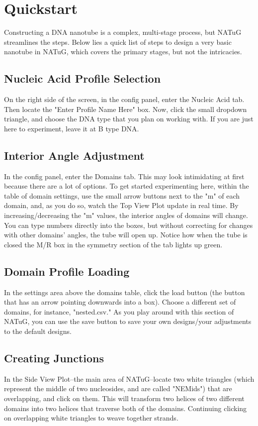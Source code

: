 \documentclass[titlepage]{article}
\begin{document}
	\section{Quickstart}
	
	Constructing a DNA nanotube is a complex, multi-stage process, but NATuG streamlines the steps. Below lies a quick list of steps to design a very basic nanotube in NATuG, which covers the primary stages, but not the intricacies.
	
	\subsection{Nucleic Acid Profile Selection}
	On the right side of the screen, in the config panel, enter the Nucleic Acid tab. Then locate the "Enter Profile Name Here" box. Now, click the small dropdown triangle, and choose the DNA type that you plan on working with. If you are just here to experiment, leave it at B type DNA.
		
	\subsection{Interior Angle Adjustment}
	In the config panel, enter the Domains tab. This may look intimidating at first because there are a lot of  options. To get started experimenting here, within the table of domain settings, use the small arrow buttons next to the "m" of each domain, and, as you do so, watch the Top View Plot update in real time. By increasing/decreasing the "m" values, the interior angles of domains will change. You can type numbers directly into the boxes, but without correcting for changes with other domains' angles, the tube will open up. Notice how when the tube is closed the M/R box in the symmetry section of the tab lights up green.
	
	\subsection{Domain Profile Loading}
	In the settings area above the domains table, click the load button (the button that has an arrow pointing downwards into a box). Choose a different set of domains, for instance, "nested.csv." As you play around with this section of NATuG, you can use the save button to save your own designs/your adjustments to the default designs.
		
		
	\subsection{Creating Junctions}
	In the Side View Plot--the main area of NATuG--locate two white triangles (which represent the middle of two nucleosides, and are called "NEMids") that are overlapping, and click on them. This will transform two helices of two different domains into two helices that traverse both of the domains. Continuing clicking on overlapping white triangles to weave together strands.
\end{document}
